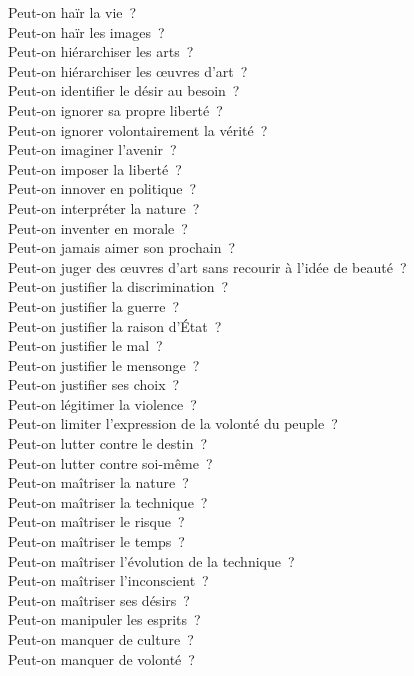 \documentclass[a4paper,12pt]{article}
\begin{document}
Peut-on haïr la vie ? \\
Peut-on haïr les images ? \\
Peut-on hiérarchiser les arts ? \\
Peut-on hiérarchiser les œuvres d'art ? \\
Peut-on identifier le désir au besoin ? \\
Peut-on ignorer sa propre liberté ? \\
Peut-on ignorer volontairement la vérité ? \\
Peut-on imaginer l'avenir ? \\
Peut-on imposer la liberté ? \\
Peut-on innover en politique ? \\
Peut-on interpréter la nature ? \\
Peut-on inventer en morale ? \\
Peut-on jamais aimer son prochain ? \\
Peut-on juger des œuvres d'art sans recourir à l'idée de beauté ? \\
Peut-on justifier la discrimination ? \\
Peut-on justifier la guerre ? \\
Peut-on justifier la raison d'État ? \\
Peut-on justifier le mal ? \\
Peut-on justifier le mensonge ? \\
Peut-on justifier ses choix ? \\
Peut-on légitimer la violence ? \\
Peut-on limiter l'expression de la volonté du peuple ? \\
Peut-on lutter contre le destin ? \\
Peut-on lutter contre soi-même ? \\
Peut-on maîtriser la nature ? \\
Peut-on maîtriser la technique ? \\
Peut-on maîtriser le risque ? \\
Peut-on maîtriser le temps ? \\
Peut-on maîtriser l'évolution de la technique ? \\
Peut-on maîtriser l'inconscient ? \\
Peut-on maîtriser ses désirs ? \\
Peut-on manipuler les esprits ? \\
Peut-on manquer de culture ? \\
Peut-on manquer de volonté ? \\
\end{document}
